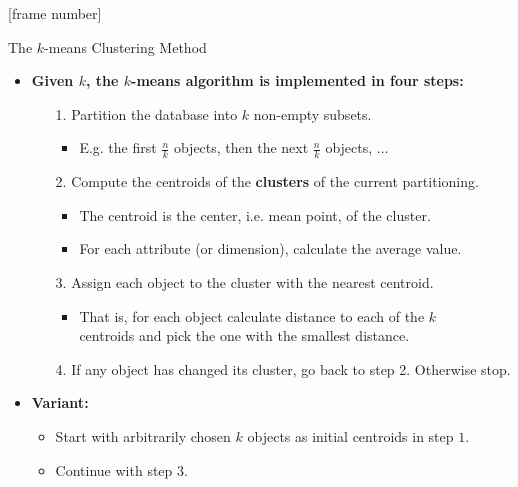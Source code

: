 \documentclass[aspectratio=169,t,xcolor=dvipsnames]{beamer}
\begin{document}
  {
    [frame number]
    \begin{frame}{The $k$-means Clustering Method}
        \begin{itemize}
          \item \textbf{Given $k$, the $k$-means algorithm is implemented in four steps:}
          \begin{itemize}
            \item[1.] Partition the database into $k$ non-empty subsets.
            \begin{itemize}
              \item E.g. the first $\frac{n}{k}$ objects, then the next $\frac{n}{k}$ objects, $\ldots$
            \end{itemize}
            \item[2.] Compute the centroids of the \textbf{clusters} of the current partitioning.
            \begin{itemize}
              \item The centroid is the center, i.e. mean point, of the cluster.
              \item For each attribute (or dimension), calculate the average value.
            \end{itemize}
            \item[3.] Assign each object to the cluster with the nearest centroid.
            \begin{itemize}
              \item That is, for each object calculate distance to each of the $k$\\
              centroids and pick the one with the smallest distance.
            \end{itemize}
          \item[4.] If any object has changed its cluster, go back to step 2. Otherwise stop.
          \end{itemize}
          \item \textbf{Variant:}
          \begin{itemize}
            \item Start with arbitrarily chosen $k$ objects as initial centroids in step $1$.
            \item Continue with step $3$.
          \end{itemize}
        \end{itemize}
    \end{frame}
  }
\end{document}
